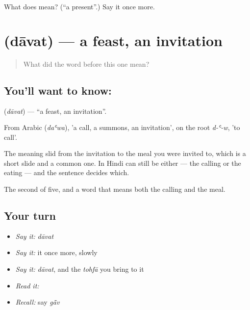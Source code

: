 \begin{tcolorbox}[breakable,colback=teal!4,colframe=teal!35!black,title={Before you move on}]
What does  mean? (\textquotedblleft{}a present\textquotedblright{}.) Say it once more.
\end{tcolorbox}
\section[\texorpdfstring{\hi{दावत} (dāvat)}{दावत (dāvat)}]{ (dāvat) — a feast, an invitation}

\label{lesson:HI-C57-feast}



\begin{quote}
What did the word before this one mean?
\end{quote}

\subsection*{You'll want to know: }
\textbf{} (\emph{dāvat}) — \textquotedblleft{}a feast, an invitation\textquotedblright{}.

From Arabic  (\emph{daʿwa}), 'a call, a summons, an invitation', on the root \emph{d-ʿ-w}, 'to call'.

The meaning slid from the invitation to the meal you were invited to, which is a short slide and a common one. In Hindi  can still be either — the calling or the eating — and the sentence decides which.

\begin{grammarlens}[title={What you've built}]
The second of five, and a word that means both the calling and the meal.
\end{grammarlens}

\subsection*{Your turn}
\begin{itemize}
\raggedright
  \item \emph{Say it:} \emph{dāvat}
  \item \emph{Say it:} it once more, slowly
  \item \emph{Say it:} \emph{dāvat}, and the \emph{tohfā} you bring to it
  \item \emph{Read it:} \textbf{}
  \item \emph{Recall:} say \emph{gā̃v}
\end{itemize}

